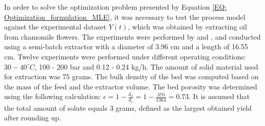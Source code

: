 \documentclass[../Article_Model_Parameters.tex]{subfiles}
\begin{document}
	
	\label{CH: Experiments}
	
	In order to solve the optimization problem presented by Equation \ref{EQ: Optimization_formulation_MLE}, it was necessary to test the process model against the experimental dataset $Y(t)$, which was obtained by extracting oil from chamomile flowers. The experiments were performed by \citet{Povh2001} and \citet{Rahimi2011}, and conducted using a semi-batch extractor with a diameter of 3.96 cm and a length of 16.55 cm. Twelve experiments were performed under different operating conditions: $30-40^\circ C$, 100 - 200 bar and 0.12 - 0.24 kg/h. The amount of solid material used for extraction was 75 grams. The bulk density of the bed was computed based on the mass of the feed and the extractor volume. The bed porosity was determined using the following calculation: $\epsilon=1-\frac{d_a}{d_r} = 1-\frac{370}{1364} = 0.73$. It is assumed that the total amount of solute equals 3 grams, defined as the largest obtained yield after rounding up.
		
\end{document}
